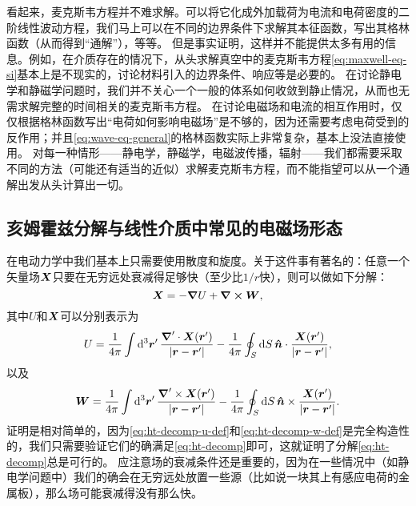 看起来，麦克斯韦方程并不难求解。可以将它化成外加载荷为电流和电荷密度的二阶线性波动方程，我们马上可以在不同的边界条件下求解其本征函数，写出其格林函数（从而得到“通解”），等等。
但是事实证明，这样并不能提供太多有用的信息。例如，在介质存在的情况下，从头求解真空中的麦克斯韦方程\eqref{eq:maxwell-eq-si}基本上是不现实的，讨论材料引入的边界条件、响应等是必要的。
在讨论静电学和静磁学问题时，我们并不关心一个一般的体系如何收敛到静止情况，从而也无需求解完整的时间相关的麦克斯韦方程。
在讨论电磁场和电流的相互作用时，仅仅根据格林函数写出“电荷如何影响电磁场”是不够的，因为还需要考虑电荷受到的反作用；并且\eqref{eq:wave-eq-general}的格林函数实际上非常复杂，基本上没法直接使用。
对每一种情形——静电学，静磁学，电磁波传播，辐射——我们都需要采取不同的方法（可能还有适当的近似）求解麦克斯韦方程，而不能指望可以从一个通解出发从头计算出一切。

\subsection{亥姆霍兹分解与线性介质中常见的电磁场形态}

在电动力学中我们基本上只需要使用散度和旋度。关于这件事有著名的：任意一个矢量场$\vb*{X}$只要在无穷远处衰减得足够快（至少比$1 / r$快），则可以做如下分解：
\begin{equation}
    \vb*{X} = - \grad{U} + \curl{\vb*{W}},
    \label{eq:ht-decomp}
\end{equation}
其中$U$和$\vb*{X}$可以分别表示为
\begin{equation}
    U = \frac{1}{4\pi} \int \dd[3]{\vb*{r}'} \frac{\grad' \cdot \vb*{X}(\vb*{r}')}{\abs{\vb*{r} - \vb*{r}'}} - \frac{1}{4\pi} \oint_S \dd{S} \vu*{n} \cdot \frac{\vb*{X}(\vb*{r}')}{\abs{\vb*{r} - \vb*{r}'}},
    \label{eq:ht-decomp-u-def}
\end{equation}
以及
\begin{equation}
    \vb*{W} = \frac{1}{4\pi} \int \dd[3]{\vb*{r}'} \frac{\grad' \times \vb*{X}(\vb*{r}')}{\abs{\vb*{r} - \vb*{r}'}} - \frac{1}{4\pi} \oint_S \dd{S} \vu*{n} \times \frac{\vb*{X}(\vb*{r}')}{\abs{\vb*{r} - \vb*{r}'}}.
    \label{eq:ht-decomp-w-def}
\end{equation}
证明是相对简单的，因为\eqref{eq:ht-decomp-u-def}和\eqref{eq:ht-decomp-w-def}是完全构造性的，我们只需要验证它们的确满足\eqref{eq:ht-decomp}即可，这就证明了分解\eqref{eq:ht-decomp}总是可行的。
应注意场的衰减条件还是重要的，因为在一些情况中（如静电学问题中）我们的确会在无穷远处放置一些源（比如说一块其上有感应电荷的金属板），那么场可能衰减得没有那么快。


